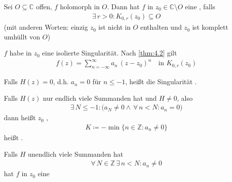 \documentclass[a4paper,10pt]{scrbook}
\begin{document}
\begin{theorem}[Definition]
  \begin{enum-arab}
    \item Sei $O \subseteq \mathbb{C}$ offen, $f$ holomorph in $O$. Dann hat $f$ in $z_0 \in \mathbb{C} \setminus O$ eine , falls
    \begin{align*}
      \exists \, r > 0 : K_{0,r}(z_0) \subseteq O
    \end{align*}
    (mit anderen Worten: einzig $z_0$ ist nicht in $O$ enthalten und $z_0$ ist komplett umhüllt von $O$)

    \item $f$ habe in $z_0$ eine isolierte Singularität. Nach \ref{thm:4.2} gilt
    \begin{align*}
      f(z) = \sum\limits_{n = -\infty}^{\infty} a_n \, (z-z_0)^n \quad \text{in } K_{0,r}(z_0)
    \end{align*}
    \begin{enum-alph}
      \item Falls $H(z) = 0$, d.h. $a_n = 0$ für $n \leq -1$, heißt die Singularität . 

      \item Falls $H(z)$ nur endlich viele Summanden hat und $H \neq 0$, also
      \begin{align*}
        \exists \, N \leq -1 : \big( a_N \neq 0 \land \, \forall \, n < N : a_n = 0 \big)
      \end{align*}
      dann heißt $z_0$ ,
      \begin{align*}
        K \coloneq - \min \{ n \in \mathbb{Z} : a_n \neq 0 \}
      \end{align*}
      heißt .

      \item Falls $H$ unendlich viele Summanden hat
      \begin{align*}
        \forall \, N \in \mathbb{Z} \, \exists \, n < N : a_n \neq 0
      \end{align*}
      hat $f$ in $z_0$ eine 
    \end{enum-alph}
  \end{enum-arab}
\end{theorem}
\end{document}

